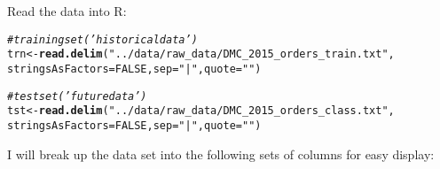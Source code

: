\documentclass[10pt]{report}
\makeatletter
\newcommand{\hlnum}[1]{\textcolor[rgb]{0.686,0.059,0.569}{#1}}%
\newcommand{\hlstr}[1]{\textcolor[rgb]{0.192,0.494,0.8}{#1}}%
\newcommand{\hlcom}[1]{\textcolor[rgb]{0.678,0.584,0.686}{\textit{#1}}}%
\newcommand{\hlstd}[1]{\textcolor[rgb]{0.345,0.345,0.345}{#1}}%
\newcommand{\hlkwb}[1]{\textcolor[rgb]{0.69,0.353,0.396}{#1}}%
\newcommand{\hlkwc}[1]{\textcolor[rgb]{0.333,0.667,0.333}{#1}}%
\newcommand{\hlkwd}[1]{\textcolor[rgb]{0.737,0.353,0.396}{\textbf{#1}}}%
\newenvironment{kframe}{%
 \def\at@end@of@kframe{}%
 \ifinner\ifhmode%
  \def\at@end@of@kframe{\end{minipage}}%
  \begin{minipage}{\columnwidth}%
 \fi\fi%
 \def\FrameCommand##1{\hskip\@totalleftmargin \hskip-\fboxsep
 \colorbox{shadecolor}{##1}\hskip-\fboxsep
     \hskip-\linewidth \hskip-\@totalleftmargin \hskip\columnwidth}%
 \MakeFramed {\advance\hsize-\width
   \@totalleftmargin\z@ \linewidth\hsize
   \@setminipage}}%
 {\par\unskip\endMakeFramed%
 \at@end@of@kframe}
\newenvironment{knitrout}{}{} %
\makeatother
\begin{document}
Read the data into R:
\begin{knitrout}
\color{fgcolor}\begin{kframe}
\begin{alltt}
\hlcom{# training set ('historical data')}
\hlstd{trn} \hlkwb{<-} \hlkwd{read.delim}\hlstd{(}\hlstr{"../data/raw_data/DMC_2015_orders_train.txt"}\hlstd{,}
    \hlkwc{stringsAsFactors} \hlstd{=} \hlnum{FALSE}\hlstd{,} \hlkwc{sep} \hlstd{=} \hlstr{"|"}\hlstd{,} \hlkwc{quote} \hlstd{=} \hlstr{""}\hlstd{)}

\hlcom{# test set ('future data')}
\hlstd{tst} \hlkwb{<-} \hlkwd{read.delim}\hlstd{(}\hlstr{"../data/raw_data/DMC_2015_orders_class.txt"}\hlstd{,}
    \hlkwc{stringsAsFactors} \hlstd{=} \hlnum{FALSE}\hlstd{,} \hlkwc{sep} \hlstd{=} \hlstr{"|"}\hlstd{,} \hlkwc{quote} \hlstd{=} \hlstr{""}\hlstd{)}
\end{alltt}
\end{kframe}
\end{knitrout}

I will break up the data set into the following sets of columns for easy display:
\end{document}
